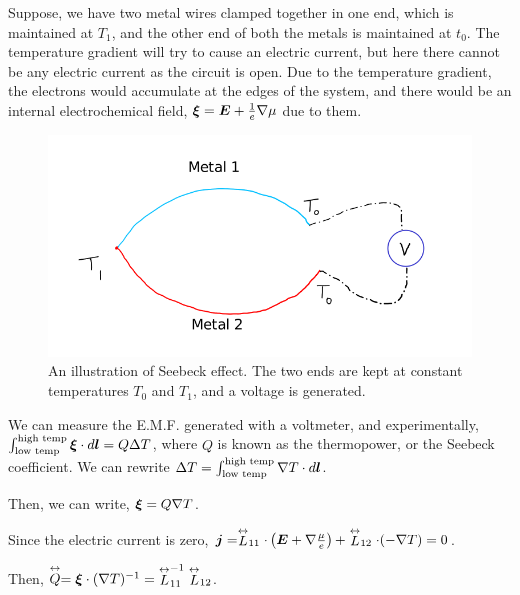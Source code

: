 \documentclass{report}
\renewcommand\vec[1]{\ensuremath\boldsymbol{#1}} %
\begin{document}
Suppose, we have two metal wires clamped together in one end, which is maintained at $T_1$, and the other end of both the metals is maintained at $t_0$. The temperature gradient will try to cause an electric current, but here there cannot be any electric current as the circuit is open. Due to the temperature gradient, the electrons would accumulate at the edges of the system, and there would be an internal electrochemical field, $\vec{\xi} = \vec{E} + \frac{1}{e} \nabla \mu$ due to them.
\begin{figure}[h!]
	\centering
	\includegraphics[width=0.7\linewidth]{seebeck}
	\caption{An illustration of Seebeck effect. The two ends are kept at constant temperatures $T_0$ and $T_1$, and a voltage is generated.}
	\label{fig:seebeck}
\end{figure}


We can measure the E.M.F. generated with a voltmeter, and experimentally, $\int_{\text{low temp}}^{\text{high temp}} \vec{\xi} \cdot d \vec{l} = Q \Delta T$, where $Q$ is known as the thermopower, or the Seebeck coefficient. We can rewrite $\Delta T = \int_{\text{low temp}}^{\text{high temp}} \nabla T \cdot d\vec{l}$.

Then, we can write, $\vec{\xi} = Q \nabla T$.

Since the electric current is zero, $\vec{j}=  \stackrel{\leftrightarrow}{L}_{11} \cdot \left(\vec{E} + \nabla \frac{\mu}{e}\right) + \stackrel{\leftrightarrow}{L}_{12} \cdot (-\nabla{T}) = 0$.

Then, $\stackrel{\leftrightarrow}{Q} = \vec{\xi} \cdot (\nabla T)^{-1} = {\stackrel{\leftrightarrow}{L}}^{-1}_{11} \stackrel{\leftrightarrow}{L}_{12}$.
\end{document}
